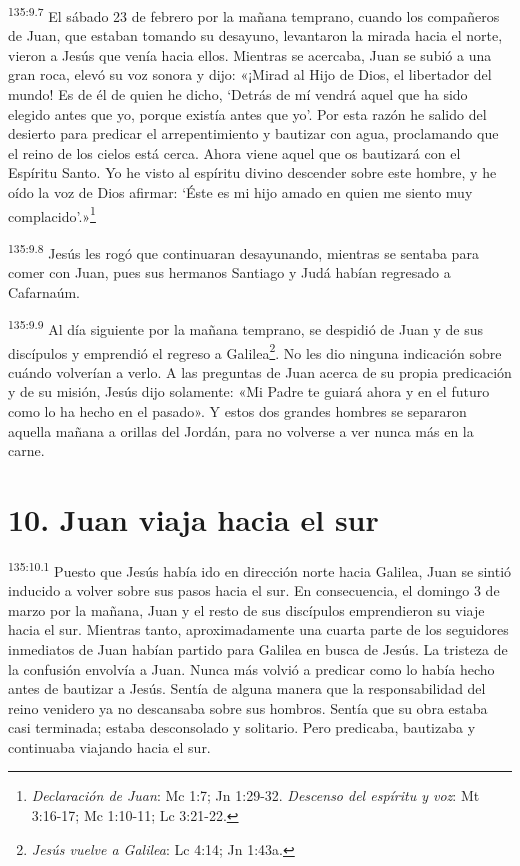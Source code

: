 \par
\textsuperscript{135:9.7} El sábado 23 de febrero por la mañana temprano, cuando los compañeros de Juan, que estaban tomando su desayuno, levantaron la mirada hacia el norte, vieron a Jesús que venía hacia ellos. Mientras se acercaba, Juan se subió a una gran roca, elevó su voz sonora y dijo: «¡Mirad al Hijo de Dios, el libertador del mundo! Es de él de quien he dicho, `Detrás de mí vendrá aquel que ha sido elegido antes que yo, porque existía antes que yo'. Por esta razón he salido del desierto para predicar el arrepentimiento y bautizar con agua, proclamando que el reino de los cielos está cerca. Ahora viene aquel que os bautizará con el Espíritu Santo. Yo he visto al espíritu divino descender sobre este hombre, y he oído la voz de Dios afirmar: `Éste es mi hijo amado en quien me siento muy complacido'.»\footnote{\textit{Declaración de Juan}: Mc 1:7; Jn 1:29-32. \textit{Descenso del espíritu y voz}: Mt 3:16-17; Mc 1:10-11; Lc 3:21-22.}

\par
\textsuperscript{135:9.8} Jesús les rogó que continuaran desayunando, mientras se sentaba para comer con Juan, pues sus hermanos Santiago y Judá habían regresado a Cafarnaúm.

\par
\textsuperscript{135:9.9} Al día siguiente por la mañana temprano, se despidió de Juan y de sus discípulos y emprendió el regreso a Galilea\footnote{\textit{Jesús vuelve a Galilea}: Lc 4:14; Jn 1:43a.}. No les dio ninguna indicación sobre cuándo volverían a verlo. A las preguntas de Juan acerca de su propia predicación y de su misión, Jesús dijo solamente: «Mi Padre te guiará ahora y en el futuro como lo ha hecho en el pasado». Y estos dos grandes hombres se separaron aquella mañana a orillas del Jordán, para no volverse a ver nunca más en la carne.

\section*{10. Juan viaja hacia el sur}
\par
\textsuperscript{135:10.1} Puesto que Jesús había ido en dirección norte hacia Galilea, Juan se sintió inducido a volver sobre sus pasos hacia el sur. En consecuencia, el domingo 3 de marzo por la mañana, Juan y el resto de sus discípulos emprendieron su viaje hacia el sur. Mientras tanto, aproximadamente una cuarta parte de los seguidores inmediatos de Juan habían partido para Galilea en busca de Jesús. La tristeza de la confusión envolvía a Juan. Nunca más volvió a predicar como lo había hecho antes de bautizar a Jesús. Sentía de alguna manera que la responsabilidad del reino venidero ya no descansaba sobre sus hombros. Sentía que su obra estaba casi terminada; estaba desconsolado y solitario. Pero predicaba, bautizaba y continuaba viajando hacia el sur.

